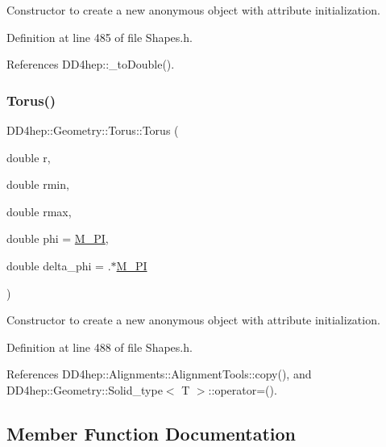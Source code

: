 Constructor to create a new anonymous object with attribute initialization. 



Definition at line 485 of file Shapes.\+h.



References D\+D4hep\+::\+\_\+to\+Double().

\hypertarget{class_d_d4hep_1_1_geometry_1_1_torus_aafbe7786b4554751775d5038fcbf8d3a}{}\label{class_d_d4hep_1_1_geometry_1_1_torus_aafbe7786b4554751775d5038fcbf8d3a} 
\subsubsection{\texorpdfstring{Torus()}{Torus()}\hspace{0.1cm}{\footnotesize\ttfamily [6/6]}}
{\footnotesize\ttfamily D\+D4hep\+::\+Geometry\+::\+Torus\+::\+Torus (\begin{DoxyParamCaption}\item[{double}]{r,  }\item[{double}]{rmin,  }\item[{double}]{rmax,  }\item[{double}]{phi = {\ttfamily \hyperlink{_x_m_l_elements_8h_ae71449b1cc6e6250b91f539153a7a0d3}{M\+\_\+\+PI}},  }\item[{double}]{delta\+\_\+phi = {.$\ast$\hyperlink{_x_m_l_elements_8h_ae71449b1cc6e6250b91f539153a7a0d3}{M\+\_\+\+PI}} }\end{DoxyParamCaption})\hspace{0.3cm}{\ttfamily [inline]}}



Constructor to create a new anonymous object with attribute initialization. 



Definition at line 488 of file Shapes.\+h.



References D\+D4hep\+::\+Alignments\+::\+Alignment\+Tools\+::copy(), and D\+D4hep\+::\+Geometry\+::\+Solid\+\_\+type$<$ T $>$\+::operator=().



\subsection{Member Function Documentation}
\hypertarget{class_d_d4hep_1_1_geometry_1_1_torus_afdb3cd4dc6b2095d511330920f0db3fa}{}\label{class_d_d4hep_1_1_geometry_1_1_torus_afdb3cd4dc6b2095d511330920f0db3fa} 
